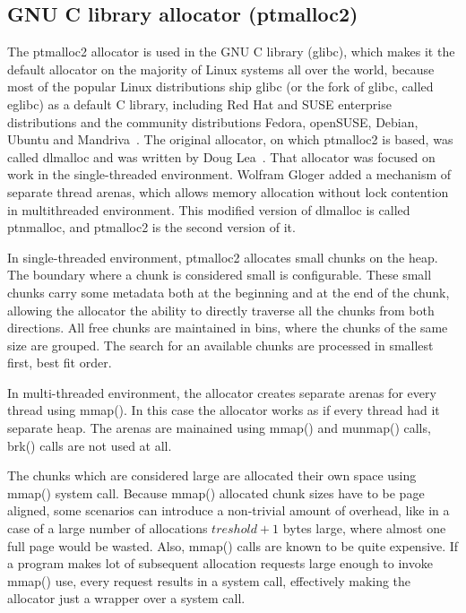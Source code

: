 \subsection{GNU C library allocator (ptmalloc2)}
The ptmalloc2 allocator is used in the GNU C library (glibc), which makes it the default allocator on the majority of Linux systems all over the world, because most of the popular Linux distributions ship glibc (or the fork of glibc, called eglibc) as a default C library, including Red Hat and SUSE enterprise distributions and the community distributions Fedora, openSUSE, Debian, Ubuntu and Mandriva~\cite{allocators:ptmalloc}. The original allocator, on which ptmalloc2 is based, was called dlmalloc and was written by Doug Lea~\cite{allocators:dlmalloc}. That allocator was focused on work in the single-threaded environment. Wolfram Gloger added a mechanism of separate thread arenas, which allows memory allocation without lock contention in multithreaded environment. This modified version of dlmalloc is called ptnmalloc, and ptmalloc2 is the second version of it.

In single-threaded environment, ptmalloc2 allocates small chunks on the heap. The boundary where a chunk is considered small is configurable. These small chunks carry some metadata both at the beginning and at the end of the chunk, allowing the allocator the ability to directly traverse all the chunks from both directions. All free chunks are maintained in bins, where the chunks of the same size are grouped. The search for an available chunks are processed in smallest first, best fit order.

In multi-threaded environment, the allocator creates separate arenas for every thread using mmap(). In this case the allocator works as if every thread had it separate heap. The arenas are mainained using mmap() and munmap() calls, brk() calls are not used at all.

The chunks which are considered large are allocated their own space using mmap() system call. Because mmap() allocated chunk sizes have to be page aligned, some scenarios can introduce a non-trivial amount of overhead, like in a case of a large number of allocations $treshold + 1$ bytes large, where almost one full page would be wasted. Also, mmap() calls are known to be quite expensive. If a program makes lot of subsequent allocation requests large enough to invoke mmap() use, every request results in a system call, effectively making the allocator just a wrapper over a system call.

